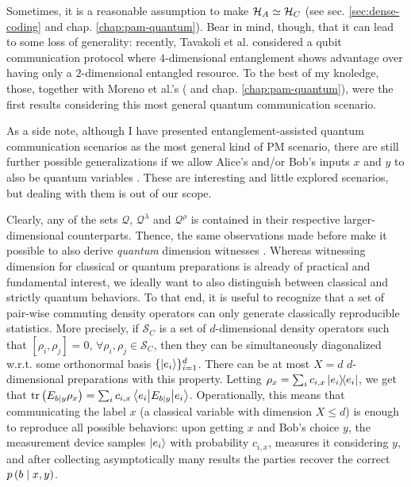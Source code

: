             Sometimes, it is a reasonable assumption to make $\mathcal{H}_A \simeq \mathcal{H}_C$ (see sec. \ref{sec:dense-coding} and chap. \ref{chap:pam-quantum}). Bear in mind, though, that it can lead to some loss of generality: recently, Tavakoli et al. \cite{tavakoli_eapam_2021} considered a qubit communication protocol where $4$-dimensional entanglement shows advantage over having only a $2$-dimensional entangled resource. To the best of my knoledge, those, together with Moreno et al.'s (\cite{moreno_pamdense_2021} and chap. \ref{chap:pam-quantum}), were the first results considering this most general quantum communication scenario.
            
            As a side note, although I have presented entanglement-assisted quantum communication scenarios as the most general kind of PM scenario, there are still further possible generalizations if we allow Alice's and/or Bob's inputs $x$ and $y$ to also be quantum variables \cite{guerini_distributed_2019}. These are interesting and little explored scenarios, but dealing with them is out of our scope.
            
            Clearly, any of the sets $\mathcal{Q}$, $\mathcal{Q}^\lambda$ and $\mathcal{Q}^\rho$ is contained in their respective larger-dimensional counterparts. Thence, the same observations made before make it possible to also derive \emph{quantum} dimension witnesses \cite{gallego_pam_2010}. Whereas witnessing dimension for classical or quantum preparations is already of practical and fundamental interest, we ideally want to also distinguish between classical and strictly quantum behaviors. To that end, it is useful to recognize that a set of pair-wise commuting density operators can only generate classically reproducible statistics. More precisely, if $\mathcal{S}_C$ is a set of $d$-dimensional density operators such that $\left[ \rho_i, \rho_j \right] = 0, \,\forall \rho_i, \rho_j \in \mathcal{S}_C$, then they can be simultaneously diagonalized w.r.t. some orthonormal basis $\{ \ket{ e_i } \}_{i=1}^d$. There can be at most $X=d$ $d$-dimensional preparations with this property. Letting $\rho_x = \sum_i c_{i,x} \ketbra{e_i}{e_i}$, we get that $\text{tr}\left(  E_{b \mid y} \rho_x  \right) = \sum_i c_{i,x} \left\langle e_i \middle\vert E_{b \mid y} \middle\vert e_i \right\rangle$. Operationally, this means that communicating the label $x$ (a classical variable with dimension $X \leq d$) is enough to reproduce all possible behaviors: upon getting $x$ and Bob's choice $y$, the measurement device samples $\ket{e_i}$ with probability $c_{i,x}$, measures it considering $y$, and after collecting asymptotically many results the parties recover the correct $p \left( b \mid x,y \right)$.  
            
